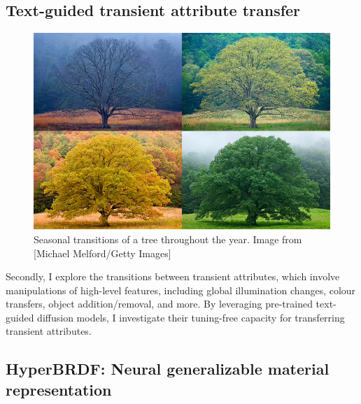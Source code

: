 
\subsection{Text-guided transient attribute transfer} 

\begin{figure}[ht]
  \centering

    \includegraphics[width=\linewidth]{Images/seasonchanges.png}

   \caption{Seasonal transitions of a tree throughout the year. Image from [Michael Melford/Getty Images]}
   \label{fig:colour-approximate}
\end{figure}

Secondly, I explore the transitions between transient attributes, which involve manipulations of high-level features, including global illumination changes, colour transfers, object addition/removal, and more. By leveraging pre-trained text-guided diffusion models, I investigate their tuning-free capacity for transferring transient attributes.

\subsection{HyperBRDF: Neural generalizable material representation}

